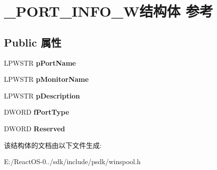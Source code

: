 \hypertarget{struct___p_o_r_t___i_n_f_o__2_w}{}\section{\+\_\+\+P\+O\+R\+T\+\_\+\+I\+N\+F\+O\+\_\+W结构体 参考}
\label{struct___p_o_r_t___i_n_f_o__2_w}
\subsection*{Public 属性}
\begin{DoxyCompactItemize}
\item 
\mbox{\label{struct___p_o_r_t___i_n_f_o__2_w_a41a84724dbbac238b86d066437ee6d00}} 
L\+P\+W\+S\+TR {\bfseries p\+Port\+Name}
\item 
\mbox{\label{struct___p_o_r_t___i_n_f_o__2_w_a424d4aaf23859402b6cf38cf2fd75905}} 
L\+P\+W\+S\+TR {\bfseries p\+Monitor\+Name}
\item 
\mbox{\label{struct___p_o_r_t___i_n_f_o__2_w_a0d02aa01e3b05eae2b8c41069a9b6d84}} 
L\+P\+W\+S\+TR {\bfseries p\+Description}
\item 
\mbox{\label{struct___p_o_r_t___i_n_f_o__2_w_a4c0df01a1d89e7021eb165bf9064d6d1}} 
D\+W\+O\+RD {\bfseries f\+Port\+Type}
\item 
\mbox{\label{struct___p_o_r_t___i_n_f_o__2_w_acef86fbd64ddf9a0a7399c2c0aaa89dd}} 
D\+W\+O\+RD {\bfseries Reserved}
\end{DoxyCompactItemize}


该结构体的文档由以下文件生成\+:\begin{DoxyCompactItemize}
\item 
E\+:/\+React\+O\+S-\/0../sdk/include/psdk/winspool.\+h\end{DoxyCompactItemize}
